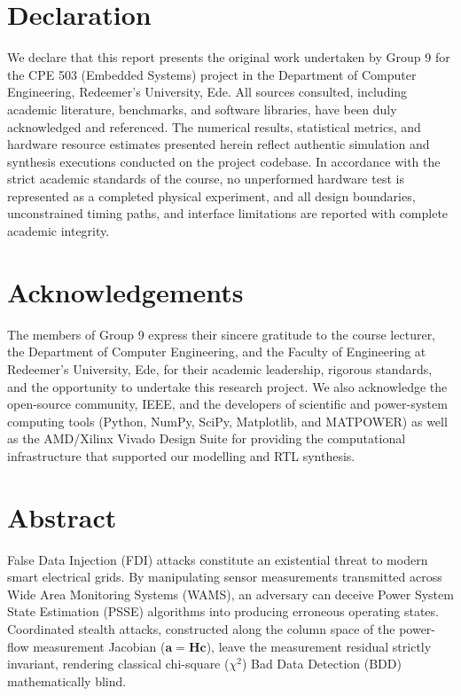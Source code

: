 \documentclass[12pt,a4paper]{report}
\begin{document}
\chapter*{Declaration}
We declare that this report presents the original work undertaken by Group 9
for the CPE 503 (Embedded Systems) project in the Department of Computer
Engineering, Redeemer's University, Ede. All sources consulted, including
academic literature, benchmarks, and software libraries, have been duly
acknowledged and referenced. The numerical results, statistical metrics,
and hardware resource estimates presented herein reflect authentic simulation
and synthesis executions conducted on the project codebase. In accordance with
the strict academic standards of the course, no unperformed hardware test is
represented as a completed physical experiment, and all design boundaries,
unconstrained timing paths, and interface limitations are reported with complete
academic integrity.

\chapter*{Acknowledgements}
The members of Group 9 express their sincere gratitude to the course
lecturer, the Department of Computer Engineering, and the Faculty of
Engineering at Redeemer's University, Ede, for their academic leadership,
rigorous standards, and the opportunity to undertake this research project.
We also acknowledge the open-source community, IEEE, and the developers of
scientific and power-system computing tools (Python, NumPy, SciPy, Matplotlib,
and MATPOWER) as well as the AMD/Xilinx Vivado Design Suite for providing the
computational infrastructure that supported our modelling and RTL synthesis.

\chapter*{Abstract}
False Data Injection (FDI) attacks constitute an existential threat to
modern smart electrical grids. By manipulating sensor measurements
transmitted across Wide Area Monitoring Systems (WAMS), an adversary can
deceive Power System State Estimation (PSSE) algorithms into producing
erroneous operating states. Coordinated stealth attacks, constructed along
the column space of the power-flow measurement Jacobian ($\boldsymbol{a} = \boldsymbol{H}\boldsymbol{c}$),
leave the measurement residual strictly invariant, rendering classical
chi-square ($\chi^2$) Bad Data Detection (BDD) mathematically blind.
\end{document}
